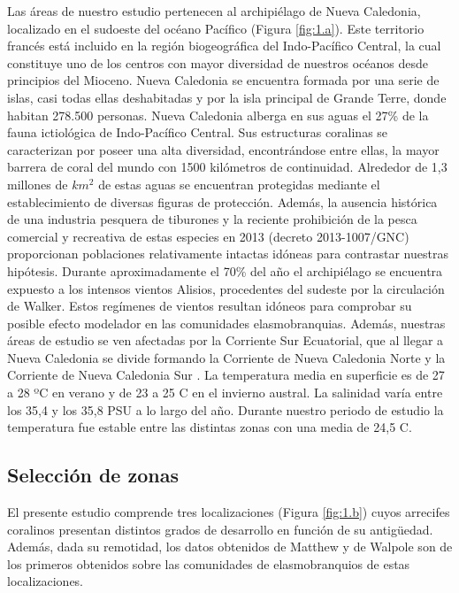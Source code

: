\documentclass[a4paper, 11pt]{article}
\begin{document}
Las áreas de nuestro estudio pertenecen al archipiélago de Nueva Caledonia, localizado en el sudoeste del océano Pacífico (Figura \ref{fig:1.a}). Este territorio francés está incluido en la región biogeográfica del Indo-Pacífico Central, la cual constituye uno de los centros con mayor diversidad de nuestros océanos desde principios del Mioceno. 
Nueva Caledonia se encuentra formada por una serie de islas, casi todas ellas deshabitadas y  por la isla principal de Grande Terre, donde habitan 278.500 personas. Nueva Caledonia alberga en sus aguas el 27\% de la fauna ictiológica de Indo-Pacífico Central. Sus estructuras coralinas se caracterizan por poseer una alta diversidad, encontrándose entre ellas, la mayor barrera de coral del mundo con 1500 kilómetros de continuidad. Alrededor de 1,3 millones de $km^2$ de estas aguas se encuentran protegidas mediante el establecimiento de diversas figuras de protección. Además, la ausencia histórica de una industria pesquera de tiburones y la reciente prohibición de la pesca comercial y recreativa de estas especies en 2013 (decreto 2013-1007/GNC) proporcionan poblaciones relativamente intactas idóneas para contrastar nuestras hipótesis.
Durante aproximadamente el 70\% del año el archipiélago se encuentra expuesto a los intensos vientos Alisios, procedentes del sudeste por la circulación de Walker. Estos regímenes de vientos resultan idóneos para comprobar su posible efecto modelador en las comunidades elasmobranquias. Además, nuestras áreas de estudio se ven afectadas por la Corriente Sur Ecuatorial, que al llegar a Nueva Caledonia se divide formando la Corriente de Nueva Caledonia Norte y la Corriente de Nueva Caledonia Sur . La temperatura media en superficie es de 27 a 28 ºC en verano y de 23 a 25 C en el invierno austral. La salinidad varía entre los 35,4 y los 35,8 PSU a lo largo del año. Durante nuestro periodo de estudio la temperatura fue estable entre las distintas zonas con una media de 24,5 C.

\subsection{Selección de zonas}
El presente estudio comprende tres localizaciones (Figura \ref{fig:1.b}) cuyos arrecifes coralinos presentan distintos grados de desarrollo en función de su antigüedad. Además, dada su remotidad, los datos obtenidos de Matthew y de Walpole son de los primeros obtenidos sobre las comunidades de elasmobranquios de estas localizaciones.
\end{document}
